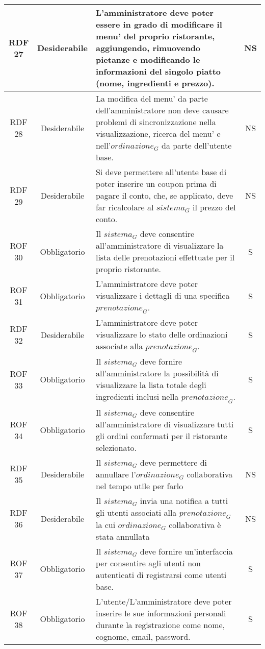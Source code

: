 \begin{longtable}{|c|c|p{12cm}|c|}
\hline
RDF 27& Desiderabile & L'amministratore deve poter essere in grado di modificare il menu' del proprio ristorante, aggiungendo, rimuovendo pietanze e modificando le informazioni del singolo piatto (nome, ingredienti e prezzo). & NS\\
\hline
RDF 28& Desiderabile & La modifica del menu' da parte dell'amministratore non deve causare problemi di sincronizzazione nella visualizzazione, ricerca del menu' e nell'$\textit{ordinazione}_G$ da parte dell'utente base. & NS\\
\hline
RDF 29& Desiderabile & Si deve permettere all'utente base di poter inserire un coupon prima di pagare il conto, che, se applicato, deve far ricalcolare al $\textit{sistema}_G$ il prezzo del conto. & NS\\
\hline
ROF 30& Obbligatorio & Il $\textit{sistema}_G$ deve consentire all'amministratore di visualizzare la lista delle prenotazioni effettuate per il proprio ristorante. & S\\
\hline
ROF 31& Obbligatorio & L'amministratore deve poter visualizzare i dettagli di una specifica $\textit{prenotazione}_G$. & S\\
\hline
RDF 32& Desiderabile & L'amministratore deve poter visualizzare lo stato delle ordinazioni associate alla $\textit{prenotazione}_G$. & S\\
\hline
ROF 33& Obbligatorio & Il $\textit{sistema}_G$ deve fornire all'amministratore la possibilità di visualizzare la lista totale degli ingredienti inclusi nella $\textit{prenotazione}_G$. & S\\
\hline
ROF 34& Obbligatorio & Il $\textit{sistema}_G$ deve consentire all'amministratore di visualizzare tutti gli ordini confermati per il ristorante selezionato. & S\\
\hline
RDF 35& Desiderabile & Il $\textit{sistema}_G$ deve permettere di annullare l'$\textit{ordinazione}_G$ collaborativa nel tempo utile per farlo & NS\\
\hline
RDF 36& Desiderabile &  Il $\textit{sistema}_G$ invia una notifica a tutti gli utenti associati alla $\textit{prenotazione}_G$ la cui $\textit{ordinazione}_G$ collaborativa è stata annullata & NS\\
\hline
ROF 37& Obbligatorio & Il $\textit{sistema}_G$ deve fornire un'interfaccia per consentire agli utenti non autenticati di registrarsi come utenti base. & S\\
\hline
ROF 38 & Obbligatorio & L'utente/L'amministratore deve poter inserire le sue informazioni personali durante la registrazione come nome, cognome, email, password. & S\\

\end{longtable}
